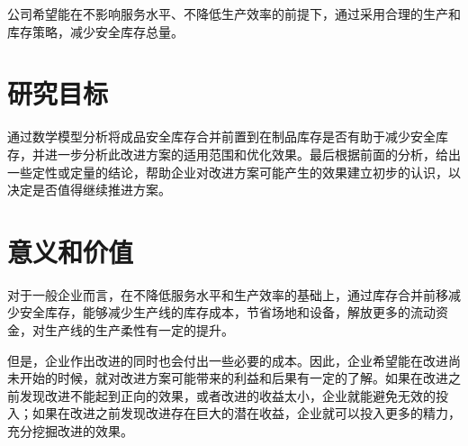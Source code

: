 公司希望能在不影响服务水平、不降低生产效率的前提下，通过采用合理的生产和库存策略，减少安全库存总量。

\section{研究目标}

通过数学模型分析将成品安全库存合并前置到在制品库存是否有助于减少安全库存，并进一步分析此改进方案的适用范围和优化效果。最后根据前面的分析，给出一些定性或定量的结论，帮助企业对改进方案可能产生的效果建立初步的认识，以决定是否值得继续推进方案。


\section{意义和价值}

对于一般企业而言，在不降低服务水平和生产效率的基础上，通过库存合并前移减少安全库存，能够减少生产线的库存成本，节省场地和设备，解放更多的流动资金，对生产线的生产柔性有一定的提升。

但是，企业作出改进的同时也会付出一些必要的成本。因此，企业希望能在改进尚未开始的时候，就对改进方案可能带来的利益和后果有一定的了解。如果在改进之前发现改进不能起到正向的效果，或者改进的收益太小，企业就能避免无效的投入；如果在改进之前发现改进存在巨大的潜在收益，企业就可以投入更多的精力，充分挖掘改进的效果。

